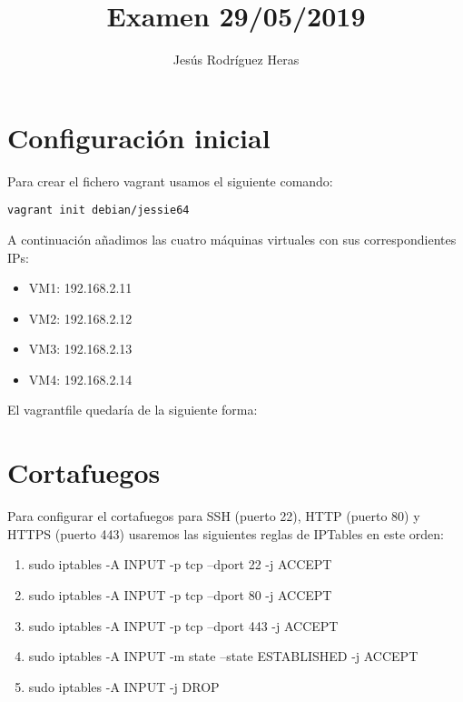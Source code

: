 \documentclass[12pt,letterpaper]{article}
\title{Examen 29/05/2019}
\author{Jesús Rodríguez Heras}
\begin{document}
	
	\maketitle
%			
	\thispagestyle{empty}
	\newpage
	
	
	
	
	
	
\section{Configuración inicial}
Para crear el fichero vagrant usamos el siguiente comando:
\begin{center}
	\texttt{vagrant init debian/jessie64}
\end{center}

A continuación añadimos las cuatro máquinas virtuales con sus correspondientes IPs:
\begin{itemize}
	\item VM1: 192.168.2.11
	\item VM2: 192.168.2.12
	\item VM3: 192.168.2.13
	\item VM4: 192.168.2.14
\end{itemize}

El vagrantfile quedaría de la siguiente forma:


\section{Cortafuegos}
Para configurar el cortafuegos para SSH (puerto 22), HTTP (puerto 80) y HTTPS (puerto 443) usaremos las siguientes reglas de IPTables en este orden:
\begin{enumerate}
	\item sudo iptables -A INPUT -p tcp --dport 22 -j ACCEPT
	\item sudo iptables -A INPUT -p tcp --dport 80 -j ACCEPT
	\item sudo iptables -A INPUT -p tcp --dport 443 -j ACCEPT
	\item sudo iptables -A INPUT -m state --state ESTABLISHED -j ACCEPT
	\item sudo iptables -A INPUT -j DROP
\end{enumerate}
\end{document}
